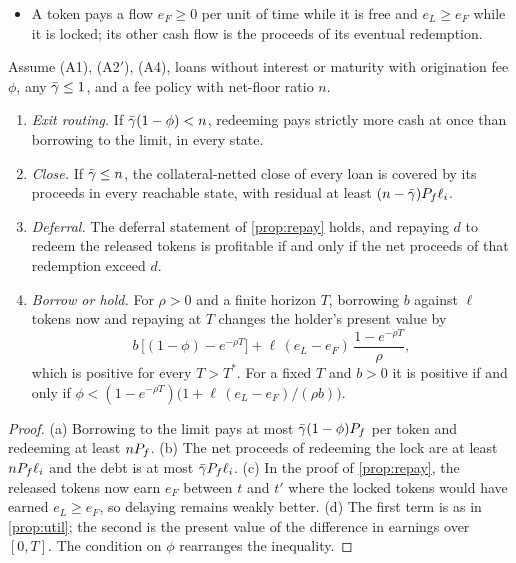 \begin{itemize}
\item[(A2$'$)] A token pays a flow $e_F\ge0$ per unit of time while it is free and $e_L\ge e_F$ while it is locked; its other cash flow is the proceeds of its eventual redemption.
\end{itemize}

\begin{proposition}\label{prop:general}
Assume (A1), (A2$'$), (A4), loans without interest or maturity with origination fee $\phi$, any $\bar\gamma\le1$, and a fee policy with net-floor ratio $n$.
\begin{enumerate}[label=(\alph*)]
\item \emph{Exit routing.} If $\bar\gamma(1-\phi)<n$, redeeming pays strictly more cash at once than borrowing to the limit, in every state.
\item \emph{Close.} If $\bar\gamma\le n$, the collateral-netted close of every loan is covered by its proceeds in every reachable state, with residual at least $(n-\bar\gamma)P_f\ell_i$.
\item \emph{Deferral.} The deferral statement of \cref{prop:repay} holds, and repaying $d$ to redeem the released tokens is profitable if and only if the net proceeds of that redemption exceed $d$.
\item \emph{Borrow or hold.} For $\rho>0$ and a finite horizon $T$, borrowing $b$ against $\ell$ tokens now and repaying at $T$ changes the holder's present value by
\[
b\,\bigl[(1-\phi)-e^{-\rho T}\bigr]+\ell\,(e_L-e_F)\,\frac{1-e^{-\rho T}}{\rho},
\]
which is positive for every $T>T^\ast$. For a fixed $T$ and $b>0$ it is positive if and only if $\phi<(1-e^{-\rho T})\bigl(1+\ell\,(e_L-e_F)/(\rho b)\bigr)$.
\end{enumerate}
\end{proposition}
\begin{proof}
(a) Borrowing to the limit pays at most $\bar\gamma(1-\phi)P_f$ per token and redeeming at least $nP_f$. (b) The net proceeds of redeeming the lock are at least $nP_f\ell_i$ and the debt is at most $\bar\gamma P_f\ell_i$. (c) In the proof of \cref{prop:repay}, the released tokens now earn $e_F$ between $t$ and $t'$ where the locked tokens would have earned $e_L\ge e_F$, so delaying remains weakly better. (d) The first term is as in \cref{prop:util}; the second is the present value of the difference in earnings over $[0,T]$. The condition on $\phi$ rearranges the inequality.
\end{proof}

